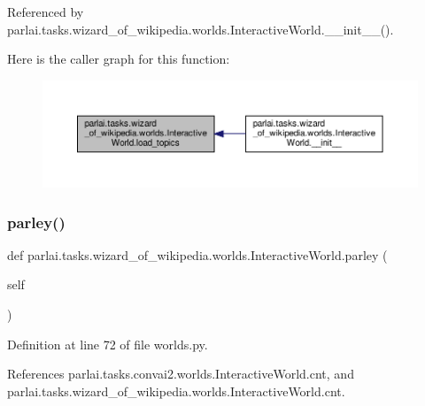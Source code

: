 Referenced by parlai.\+tasks.\+wizard\+\_\+of\+\_\+wikipedia.\+worlds.\+Interactive\+World.\+\_\+\+\_\+init\+\_\+\+\_\+().

Here is the caller graph for this function\+:
\nopagebreak
\begin{figure}[H]
\begin{center}
\leavevmode
\includegraphics[width=350pt]{classparlai_1_1tasks_1_1wizard__of__wikipedia_1_1worlds_1_1InteractiveWorld_af4efe25e565dbf73a46d1559eb425243_icgraph}
\end{center}
\end{figure}
\mbox{\label{classparlai_1_1tasks_1_1wizard__of__wikipedia_1_1worlds_1_1InteractiveWorld_afcda29202fc3fd773522edbd3c40e4a4}} 
\subsubsection{\texorpdfstring{parley()}{parley()}}
{\footnotesize\ttfamily def parlai.\+tasks.\+wizard\+\_\+of\+\_\+wikipedia.\+worlds.\+Interactive\+World.\+parley (\begin{DoxyParamCaption}\item[{}]{self }\end{DoxyParamCaption})}



Definition at line 72 of file worlds.\+py.



References parlai.\+tasks.\+convai2.\+worlds.\+Interactive\+World.\+cnt, and parlai.\+tasks.\+wizard\+\_\+of\+\_\+wikipedia.\+worlds.\+Interactive\+World.\+cnt.



